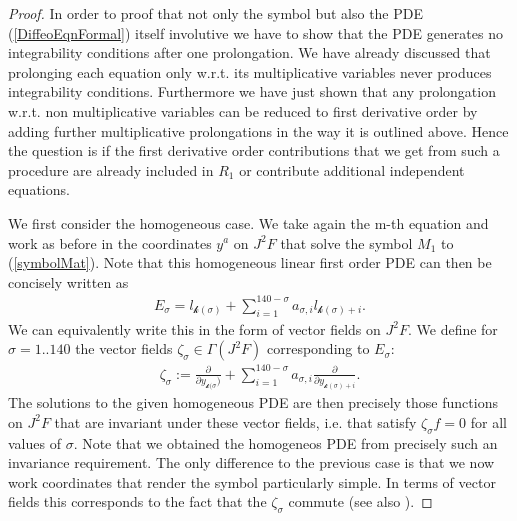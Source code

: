 \documentclass[a4paper,12pt, DIV=14, BCOR=5mm, twoside, headsepline, numbers=noenddot]{scrbook}
\begin{document}
\begin{proof}
In order to proof that not only the symbol but also the PDE (\ref{DiffeoEqnFormal}) itself involutive we have to show that the PDE generates no integrability conditions after one prolongation. We have already discussed that prolonging each equation only w.r.t. its multiplicative variables never produces integrability conditions. Furthermore we have just shown that any prolongation w.r.t. non multiplicative variables can be reduced to first derivative order by adding further multiplicative prolongations in the way it is outlined above. Hence the question is if the first derivative order contributions that we get from such a procedure are already included in $R_1$ or contribute additional independent equations. 

We first consider the homogeneous case. We take again the m-th equation and work as before in the coordinates $y^a$ on $J^2F$ that solve the symbol $M_1$ to (\ref{symbolMat}). Note that this homogeneous linear first order PDE can then be concisely written as
\begin{align}
    E_{\sigma} = l_{\mathcal{k}(\sigma)} + \sum_{i = 1}^{140-\sigma} a_{\sigma,i} l_{\mathcal{k}(\sigma)+i} .
\end{align}
We can equivalently write this in the form of vector fields on $J^2F$. We define for $\sigma = 1..140$ the vector fields $\zeta_{\sigma} \in \Gamma(J^2F) $ corresponding to $E_{\sigma}$:
\begin{align}
    \zeta_{\sigma} := \frac{\partial}{\partial y_{\mathcal{k}(\sigma})} + \sum_{i = 1}^{140-\sigma} a_{\sigma,i} \frac{\partial}{\partial y_{\mathcal{k}(\sigma)+i}}.
\end{align}
The solutions to the given homogeneous PDE are then precisely those functions on $J^2F$ that are invariant under these vector fields, i.e. that satisfy $\zeta_{\sigma} f = 0$ for all values of $\sigma$.
Note that we obtained the homogeneos PDE from precisely such an invariance requirement. The only difference to the previous case is that we now work coordinates that render the symbol particularly simple. 
In terms of vector fields this corresponds to the fact that the $\zeta_{\sigma}$ commute (see also \cite{seiler1994analysis}).
%
%
%


\end{proof}
\end{document}
